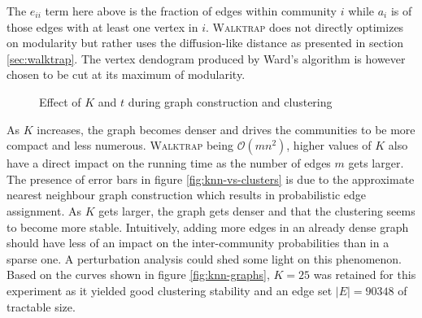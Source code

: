 The $e_{ii}$ term here above is the fraction of edges within community $i$ while $a_i$ is of those edges with at least one vertex in $i$. \textsc{Walktrap} does not directly optimizes on modularity but rather uses the diffusion-like distance as presented in section \ref{sec:walktrap}.
The vertex dendogram produced by Ward's algorithm is however chosen to be cut at its maximum of modularity. 

\begin{figure}
\centering
{}\hspace{2mm}%
\label{fig:pinball-graph}
\caption{Effect of $K$ and $t$ during graph construction and clustering}
\end{figure}

As $K$ increases, the graph becomes denser and drives the communities to be more compact and less numerous. \textsc{Walktrap} being $\mathcal{O}(mn^2)$, higher values of $K$ also have a direct impact on the running time as the number of edges $m$ gets larger. The presence of error bars in figure \ref{fig:knn-vs-clusters} is due to the approximate nearest neighbour graph construction which results in probabilistic edge assignment. As $K$ gets larger, the graph gets denser and that the clustering seems to become more stable. Intuitively, adding more edges in an already dense graph should have less of an impact on the inter-community probabilities than in a sparse one. A perturbation analysis could shed some light on this phenomenon. Based on the curves shown in figure \ref{fig:knn-graphs}, $K=25$ was retained for this experiment as it yielded good clustering stability and an edge set $|E| = 90348$ of tractable size. 

